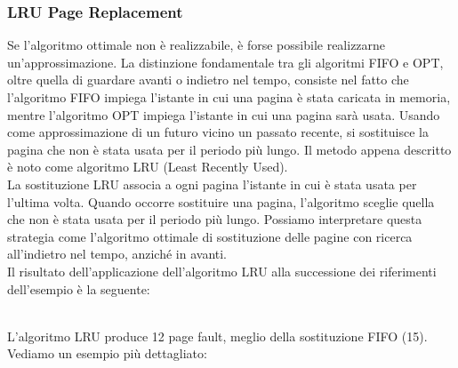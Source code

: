 \documentclass{article}
\begin{document}
			\subsubsection{LRU Page Replacement}
				Se l’algoritmo ottimale non è realizzabile, è forse possibile realizzarne un’approssimazione. La distinzione fondamentale tra gli algoritmi FIFO e OPT, oltre quella di guardare avanti o indietro nel tempo, consiste nel fatto che l’algoritmo FIFO impiega l’istante in cui una pagina è stata caricata in memoria, mentre l’algoritmo OPT impiega l’istante in cui una pagina sarà usata. Usando come approssimazione di un futuro vicino un passato recente, si sostituisce la pagina che non è stata usata per il periodo più lungo. Il metodo appena descritto è noto come algoritmo LRU (Least Recently Used).
				\\La sostituzione LRU associa a ogni pagina l’istante in cui è stata usata per l’ultima volta. Quando occorre sostituire una pagina, l’algoritmo sceglie quella che non è stata usata per il periodo più lungo. Possiamo interpretare questa strategia come l’algoritmo ottimale di sostituzione delle pagine con ricerca all’indietro nel tempo, anziché in avanti.
				\\Il risultato dell’applicazione dell’algoritmo LRU alla successione dei riferimenti dell’esempio è la seguente:
				\begin{figure}[ht!]
				\end{figure}
				\\L’algoritmo LRU produce 12 page fault, meglio della sostituzione FIFO (15).
				\\Vediamo un esempio più dettagliato:
				\begin{figure}[ht!]
				\end{figure}
\end{document}
